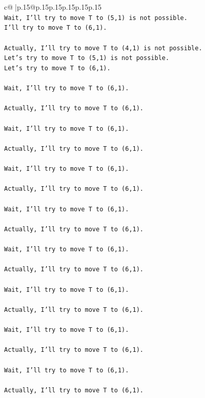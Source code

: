 \documentclass{article}
\begin{document}
{\begin{supertabular}{c@{$\;$}|p{.15\linewidth}@{}p{.15\linewidth}p{.15\linewidth}p{.15\linewidth}p{.15\linewidth}p{.15\linewidth}}
{{{\\ 
\texttt{Wait, I'll try to move T to (5,1) is not possible.} \\
\texttt{I'll try to move T to (6,1).} \\
\\ 
\texttt{Actually, I'll try to move T to (4,1) is not possible.} \\
\texttt{Let's try to move T to (5,1) is not possible.} \\
\texttt{Let's try to move T to (6,1).} \\
\\ 
\texttt{Wait, I'll try to move T to (6,1).} \\
\\ 
\texttt{Actually, I'll try to move T to (6,1).} \\
\\ 
\texttt{Wait, I'll try to move T to (6,1).} \\
\\ 
\texttt{Actually, I'll try to move T to (6,1).} \\
\\ 
\texttt{Wait, I'll try to move T to (6,1).} \\
\\ 
\texttt{Actually, I'll try to move T to (6,1).} \\
\\ 
\texttt{Wait, I'll try to move T to (6,1).} \\
\\ 
\texttt{Actually, I'll try to move T to (6,1).} \\
\\ 
\texttt{Wait, I'll try to move T to (6,1).} \\
\\ 
\texttt{Actually, I'll try to move T to (6,1).} \\
\\ 
\texttt{Wait, I'll try to move T to (6,1).} \\
\\ 
\texttt{Actually, I'll try to move T to (6,1).} \\
\\ 
\texttt{Wait, I'll try to move T to (6,1).} \\
\\ 
\texttt{Actually, I'll try to move T to (6,1).} \\
\\ 
\texttt{Wait, I'll try to move T to (6,1).} \\
\\ 
\texttt{Actually, I'll try to move T to (6,1).} \\
}}}
\end{supertabular}}
\end{document}
